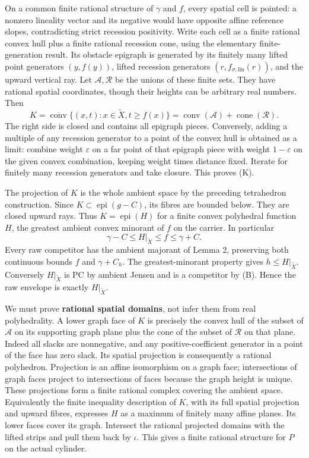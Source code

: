 \documentclass[
  11pt,
]{article}
\begin{document}
On a common finite rational structure of \(\gamma\) and \(f\), every
spatial cell is pointed: a nonzero lineality vector and its negative
would have opposite affine reference slopes, contradicting strict
recession positivity. Write each cell as a finite rational convex hull
plus a finite rational recession cone, using the elementary
finite-generation result. Its obstacle epigraph is generated by its
finitely many lifted point generators \((y,f(y))\), lifted recession
generators \((r,f_{\sigma,\mathrm{lin}}(r))\), and the upward vertical
ray. Let \(\mathcal A,\mathcal R\) be the unions of these finite sets.
They have rational spatial coordinates, though their heights can be
arbitrary real numbers. Then \[
K=\overline{\operatorname{conv}}\{(x,t):x\in\widetilde X,t\geq f(x)\}
=\operatorname{conv}(\mathcal A)+\operatorname{cone}(\mathcal R).
\tag{K}
\] The right side is closed and contains all epigraph pieces.
Conversely, adding a multiple of any recession generator to a point of
the convex hull is obtained as a limit: combine weight \(\varepsilon\)
on a far point of that epigraph piece with weight \(1-\varepsilon\) on
the given convex combination, keeping weight times distance fixed.
Iterate for finitely many recession generators and take closure. This
proves (K).

The projection of \(K\) is the whole ambient space by the preceding
tetrahedron construction. Since \(K\subset\operatorname{epi}(g-C)\), its
fibres are bounded below. They are closed upward rays. Thus
\(K=\operatorname{epi}(H)\) for a finite convex polyhedral function
\(H\), the greatest ambient convex minorant of \(f\) on the carrier. In
particular \[
\gamma-C\leq H|_{\widetilde X}\leq f\leq\gamma+C.
\tag{B}
\] Every raw competitor has the ambient majorant of Lemma 2, preserving
both continuous bounds \(f\) and \(\gamma+C_h\). The greatest-minorant
property gives \(h\leq H|_{\widetilde X}\). Conversely
\(H|_{\widetilde X}\) is PC by ambient Jensen and is a competitor by
(B). Hence the raw envelope is exactly \(H|_{\widetilde X}\).

We must prove \textbf{rational spatial domains}, not infer them from
real polyhedrality. A lower graph face of \(K\) is precisely the convex
hull of the subset of \(\mathcal A\) on its supporting graph plane plus
the cone of the subset of \(\mathcal R\) on that plane. Indeed all
slacks are nonnegative, and any positive-coefficient generator in a
point of the face has zero slack. Its spatial projection is consequently
a rational polyhedron. Projection is an affine isomorphism on a graph
face; intersections of graph faces project to intersections of faces
because the graph height is unique. These projections form a finite
rational complex covering the ambient space. Equivalently the finite
inequality description of \(K\), with its full spatial projection and
upward fibres, expresses \(H\) as a maximum of finitely many affine
planes. Its lower faces cover its graph. Intersect the rational
projected domains with the lifted strips and pull them back by
\(\iota\). This gives a finite rational structure for \(P\) on the
actual cylinder.
\end{document}

